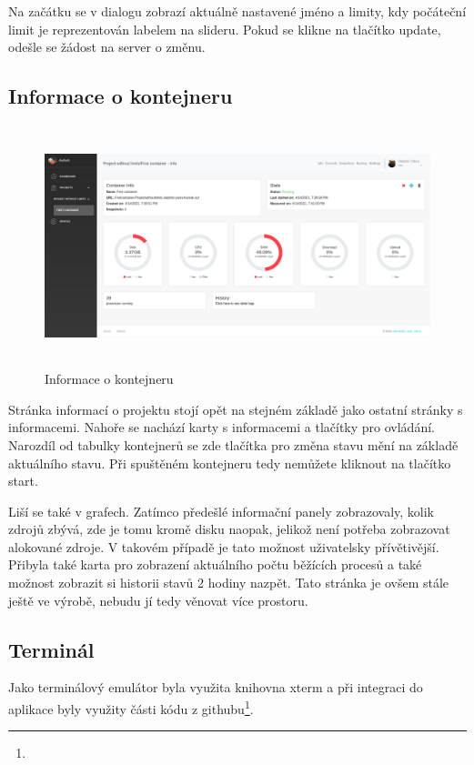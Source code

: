 \documentclass[a4paper,oneside,12pt]{report}
\begin{document}
Na začátku se v dialogu zobrazí aktuálně nastavené jméno a limity, kdy počáteční limit je reprezentován labelem na slideru. Pokud se klikne na tlačítko update, odešle se žádost na server o změnu.

\subsection{Informace o kontejneru}

\begin{figure}[h]
	\centering
	\includegraphics[height=7cm]{../img/conInfo.png}
	\caption[Informace o kontejneru, vlastní tvorba]{Informace o kontejneru}
	\label{fig:coninfo}
\end{figure}

Stránka informací o projektu stojí opět na stejném základě jako ostatní stránky s informacemi. Nahoře se nachází karty s informacemi a tlačítky pro ovládání. Narozdíl od tabulky kontejnerů se zde tlačítka pro změna stavu mění na základě aktuálního stavu. Při spuštěném kontejneru tedy nemůžete kliknout na tlačítko start.

Liší se také v grafech. Zatímco předešlé informační panely zobrazovaly, kolik zdrojů zbývá, zde je tomu kromě disku naopak, jelikož není potřeba zobrazovat alokované zdroje. V takovém případě je tato možnost uživatelsky přívětivější.
Přibyla také karta pro zobrazení aktuálního počtu běžících procesů a také možnost zobrazit si historii stavů 2 hodiny nazpět. Tato stránka je ovšem stále ještě ve výrobě, nebudu jí tedy věnovat více prostoru.

\subsection{Terminál}

Jako terminálový emulátor byla využita knihovna xterm a při integraci do aplikace byly využity části kódu z githubu\footnote{}.
\end{document}
